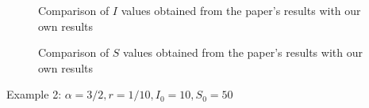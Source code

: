 \documentclass[10pt]{article}
\begin{document}
\begin{figure}[!htbp]
  \centering
  \hfill
  \caption{Comparison of \(I\) values obtained from the paper's results with our own results  }
\end{figure}
\begin{figure}[!htbp]
  \centering
  \hfill
  \caption{Comparison of \(S\) values obtained from the paper's results with our own results  }
\end{figure}
\newpage
 Example 2: $\alpha=3 / 2, r=1 / 10, I_{0}=10, S_{0}=50$
\end{document}
